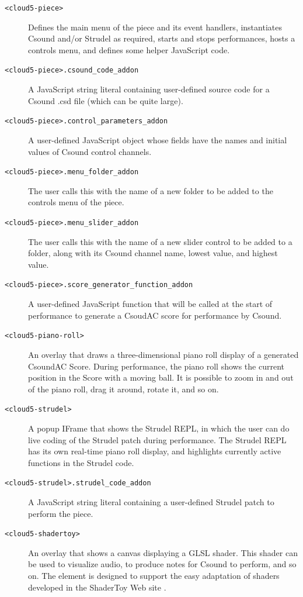\documentclass[runningheads,a4paper]{llncs}
\begin{document}
\begin{description}
\item[\texttt{<cloud5-piece>}] Defines the main menu of the piece and its event handlers, instantiates Csound and/or Strudel as required, starts and stops performances, hosts a controls menu, and defines some helper JavaScript code.
\item[\texttt{<cloud5-piece>.csound\_code\_addon}]  A JavaScript string literal containing user-defined source code for a Csound .csd file (which can be quite large).
\item[\texttt{<cloud5-piece>.control\_parameters\_addon}]  A user-defined JavaScript object whose fields have the names and initial values of Csound control channels.
\item[\texttt{<cloud5-piece>.menu\_folder\_addon}]  The user calls this with the name of a new folder to be added to the controls menu of the piece.
\item[\texttt{<cloud5-piece>.menu\_slider\_addon}]  The user calls this with the name of a new slider control to be added to a folder, along with its Csound channel name, lowest value, and highest value.
\item[\texttt{<cloud5-piece>.score\_generator\_function\_addon}]  A user-defined JavaScript function that will be called at the start of performance to generate a CsoudAC score for performance by Csound. 
\item[\texttt{<cloud5-piano-roll>}] An overlay that draws a three-dimensional piano roll display of a generated CsoundAC Score. During performance, the piano roll shows the current position in the Score with a moving ball. It is possible to zoom in and out of the piano roll, drag it around, rotate it, and so on.
\item[\texttt{<cloud5-strudel>}] A popup IFrame that shows the Strudel REPL, in which the user can do live coding of the Strudel patch during performance. The Strudel REPL has its own real-time piano roll display, and highlights currently active functions in the Strudel code.
\item[\texttt{<cloud5-strudel>.strudel\_code\_addon}] A JavaScript string literal containing a user-defined  Strudel patch to perform the piece.
\item[\texttt{<cloud5-shadertoy>}] An overlay that shows a canvas displaying a GLSL shader. This shader can be used to visualize audio, to produce notes for Csound to perform, and so on. The element is designed to support the easy adaptation of shaders developed in the ShaderToy Web site \cite{shadertoy}.

\end{description}
\end{document}
